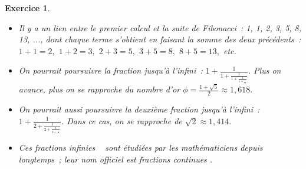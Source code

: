 \documentclass[10pt]{article}
\newtheorem{exo}{Exercice}
\begin{document}
\begin{exo}
\begin{itemize}
\item[\textbullet] Il y a un lien entre le premier calcul et la suite de Fibonacci~: 1, 1, 2, 3, 5, 8, 13, ..., dont chaque terme s'obtient  en faisant la somme des deux précédents~: $1+1=2,$ $1+2=3,$ $2+3=5,$ $3+5=8,$ $8+5=13,$ etc.
\item[\textbullet] On pourrait poursuivre la fraction jusqu'à l'infini~: $1+\frac{1}{1
+\frac{1}{1
+\frac{1}{1+\frac{1}{\cdots}}}}.$ Plus on avance, plus on se rapproche du nombre d'or $\phi=\frac{1+\sqrt{5}}{2}\approx 1,618.$
\item[\textbullet] On pourrait aussi poursuivre la deuxième fraction jusqu'à l'infini~: $1+\frac{1}{2
+\frac{1}{2
+\frac{1}{2+\frac{1}{\cdots}}}}.$ Dans ce cas, on se rapproche de $\sqrt{2}\approx 1,414.$
\item[\textbullet] Ces \og fractions infinies \fg~{} sont étudiées par les mathématiciens depuis longtemps~; leur nom officiel est \og fractions continues \fg.
\end{itemize}

\end{exo}
\end{document}
